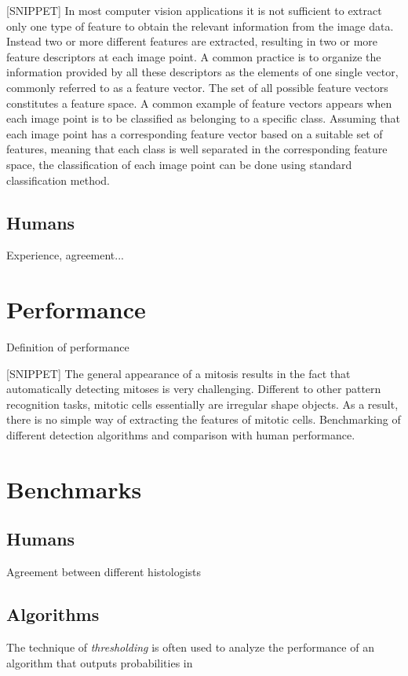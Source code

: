 [SNIPPET]
In most computer vision applications it is not sufficient to extract only one type of feature to obtain the relevant information from the image data.
Instead two or more different features are extracted, resulting in two or more feature descriptors at each image point.
A common practice is to organize the information provided by all these descriptors as the elements of one single vector,
commonly referred to as a feature vector. The set of all possible feature vectors constitutes a feature space.
A common example of feature vectors appears when each image point is to be classified as belonging to a specific class.
Assuming that each image point has a corresponding feature vector based on a suitable set of features,
meaning that each class is well separated in the corresponding feature space, the classification of each image point can be done using standard classification method.






\subsection{Humans}

Experience, agreement...

\vspace{0.5cm}

\section{Performance}

Definition of performance


[SNIPPET]
The general appearance of a mitosis results in the fact that automatically detecting mitoses is very challenging.
Different to other pattern recognition tasks, mitotic cells essentially are irregular shape objects. As a result, there
is no simple way of extracting the features of mitotic cells.
Benchmarking of different detection algorithms and comparison with human performance.


\section{Benchmarks}
\label{ch3:Bench}

\vspace{0.5cm}

\subsection{Humans}
\label{ch3:humans}


Agreement between different histologists

\subsection{Algorithms}

The technique of \textit{thresholding} is often used to analyze the performance of an algorithm that outputs probabilities in 

